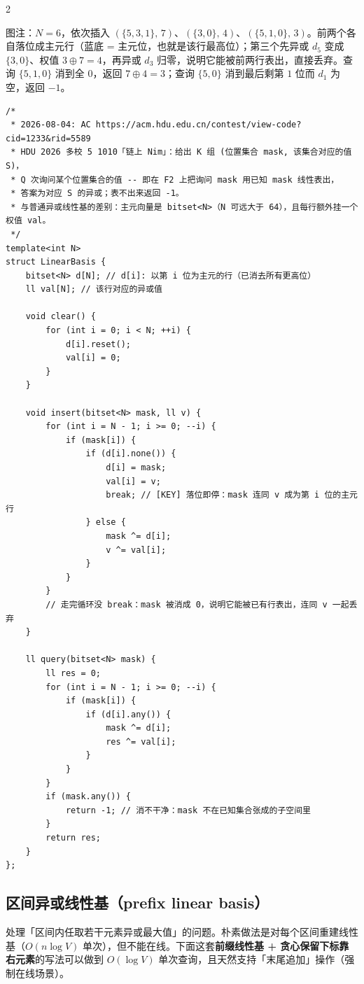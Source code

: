 \begin{multicols*}{2}
\begin{center}
			\vspace{2pt}
			{\footnotesize\sffamily\color{gray} 图注：$N = 6$，依次插入 $(\{5,3,1\},\,7)$、$(\{3,0\},\,4)$、$(\{5,1,0\},\,3)$。前两个各自落位成主元行（\textcolor{blue!60!black}{蓝底} = 主元位，也就是该行最高位）；第三个先异或 $d_5$ 变成 $\{3,0\}$、权值 $3 \oplus 7 = 4$，再异或 $d_3$ 归零，说明它能被前两行表出，直接丢弃。查询 $\{5,1,0\}$ 消到全 $0$，返回 $7 \oplus 4 = 3$；查询 $\{5,0\}$ 消到最后剩第 $1$ 位而 $d_1$ 为空，返回 $-1$。}
		\end{center}

		\begin{verbatim}
/*
 * 2026-08-04: AC https://acm.hdu.edu.cn/contest/view-code?cid=1233&rid=5589
 * HDU 2026 多校 5 1010「链上 Nim」：给出 K 组 (位置集合 mask, 该集合对应的值 S)，
 * Q 次询问某个位置集合的值 -- 即在 F2 上把询问 mask 用已知 mask 线性表出，
 * 答案为对应 S 的异或；表不出来返回 -1。
 * 与普通异或线性基的差别：主元向量是 bitset<N>（N 可远大于 64），且每行额外挂一个权值 val。
 */
template<int N>
struct LinearBasis {
	bitset<N> d[N]; // d[i]: 以第 i 位为主元的行（已消去所有更高位）
	ll val[N]; // 该行对应的异或值

	void clear() {
		for (int i = 0; i < N; ++i) {
			d[i].reset();
			val[i] = 0;
		}
	}

	void insert(bitset<N> mask, ll v) {
		for (int i = N - 1; i >= 0; --i) {
			if (mask[i]) {
				if (d[i].none()) {
					d[i] = mask;
					val[i] = v;
					break; // [KEY] 落位即停：mask 连同 v 成为第 i 位的主元行
				} else {
					mask ^= d[i];
					v ^= val[i];
				}
			}
		}
		// 走完循环没 break：mask 被消成 0，说明它能被已有行表出，连同 v 一起丢弃
	}

	ll query(bitset<N> mask) {
		ll res = 0;
		for (int i = N - 1; i >= 0; --i) {
			if (mask[i]) {
				if (d[i].any()) {
					mask ^= d[i];
					res ^= val[i];
				}
			}
		}
		if (mask.any()) {
			return -1; // 消不干净：mask 不在已知集合张成的子空间里
		}
		return res;
	}
};
		\end{verbatim}

		\subsection{区间异或线性基（prefix linear basis）}

		处理「区间内任取若干元素异或最大值」的问题。朴素做法是对每个区间重建线性基（$O(n \log V)$ 单次），但不能在线。下面这套\textbf{前缀线性基 + 贪心保留下标靠右元素}的写法可以做到 $O(\log V)$ 单次查询，且天然支持「末尾追加」操作（强制在线场景）。


\end{multicols*}
